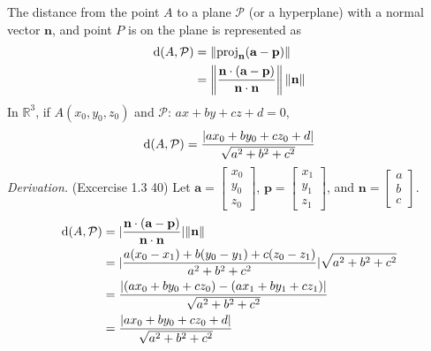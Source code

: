 \noindent
The distance from the point $A$ to a plane $\mathcal{P}$ (or a hyperplane) with a normal vector $\textbf{n}$, and point $P$ is on the plane is represented as
\begin{align*}
	\textnormal{d}(A,\mathcal{P})
	&= 
	\left\| \textnormal{proj}_\textbf{n}(\textbf{a}-\textbf{p}) \right\| \\
	&= \left\| \frac{\textbf{n}\cdot(\textbf{a}-\textbf{p})}{\textbf{n}\cdot\textbf{n}}\right\|  \left\| \textbf{n} \right\|
\end{align*}
In $\mathbb{R}^3$, if $A(x_0,y_0,z_0)$ and $\mathcal{P}$: $ax+by+cz+d=0$,
\begin{align*}
	\textnormal{d}(A,\mathcal{P})=\frac{|ax_0+by_0+cz_0+d|}{\sqrt{a^2+b^2+c^2}}
\end{align*}
\textit{Derivation.} (Excercise 1.3 40)
Let $\textbf{a}=\begin{bmatrix} x_0 \\ y_0 \\ z_0 \end{bmatrix}$,
$\textbf{p}=\begin{bmatrix} x_1 \\ y_1 \\ z_1 \end{bmatrix}$,
and $\textbf{n}=\begin{bmatrix} a \\ b \\ c \end{bmatrix}$.
\begin{align*}
	\textnormal{d}(A,\mathcal{P})
	&= |\frac{\textbf{n}\cdot(\textbf{a}-\textbf{p})}{\textbf{n}\cdot\textbf{n}}| \Vert \textbf{n} \Vert \\
	&= |\frac{a(x_0-x_1)+b(y_0-y_1)+c(z_0-z_1)}{a^2+b^2+c^2}|\sqrt{a^2+b^2+c^2} \\
	&= \frac{|(ax_0+by_0+cz_0)-(ax_1+by_1+cz_1)|}{\sqrt{a^2+b^2+c^2}} \\
	&= \frac{|ax_0+by_0+cz_0+d|}{\sqrt{a^2+b^2+c^2}}
\end{align*}

